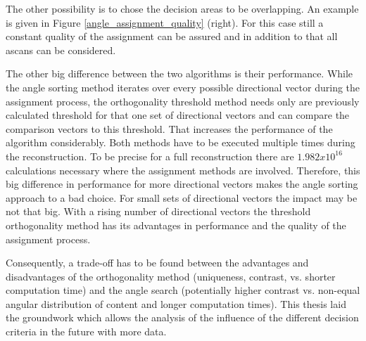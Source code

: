 The other possibility is to chose the decision areas to be overlapping. An example is given in Figure \ref{angle_assignment_quality} (right). For this case still a constant quality of the assignment can be assured and in addition to that all \acp{ascan} can be considered.

\bigskip

The other big difference between the two algorithms is their performance. While the angle sorting method iterates over every possible directional vector during the assignment process, the orthogonality threshold method needs only are previously calculated threshold for that one set of directional vectors and can compare the comparison vectors to this threshold. That increases the performance of the algorithm considerably. Both methods have to be executed multiple times during the reconstruction. To be precise for a full reconstruction there are $1.982x10^{16}$ calculations necessary where the assignment methods are involved. Therefore, this big difference in performance for more directional vectors makes the angle sorting approach to a bad choice. For small sets of directional vectors the impact may be not that big. With a rising number of directional vectors the threshold orthogonality method has its advantages in performance and the quality of the assignment process.  


Consequently, a trade-off has to be found between the advantages and disadvantages of the orthogonality method (uniqueness, contrast, vs. shorter computation time) and the angle search (potentially higher contrast vs. non-equal angular distribution of content and longer computation times). This thesis laid the groundwork which allows the analysis of the influence of the different decision criteria in the future with more data.










